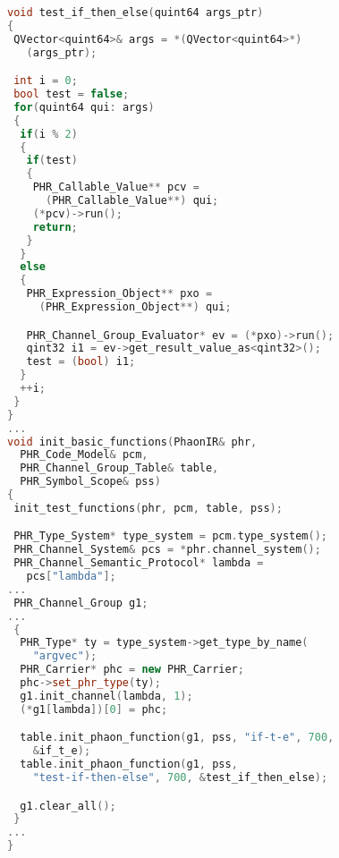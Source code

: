 \begin{lstlisting}[caption={%
\emblink{\#lst--ifte--\thelstlisting.pgvm-pdf}{Implementing If/Then/Else Blocks 
  (deferred evaluation)}},
  language = C++, numbers = none, escapechar = !,label={lst:ifte},
    basicstyle = \ttfamily\bfseries\footnotesize, linewidth = \linewidth]
void test_if_then_else(quint64 args_ptr)
{
 QVector<quint64>& args = *(QVector<quint64>*)
   (args_ptr);

 int i = 0;
 bool test = false;
 for(quint64 qui: args)
 {
  if(i % 2)
  {
   if(test)
   {
    PHR_Callable_Value** pcv = 
      (PHR_Callable_Value**) qui;
    (*pcv)->run();
    return;
   }
  }
  else
  {
   PHR_Expression_Object** pxo = 
     (PHR_Expression_Object**) qui;

   PHR_Channel_Group_Evaluator* ev = (*pxo)->run();
   qint32 i1 = ev->get_result_value_as<qint32>();
   test = (bool) i1;
  }
  ++i;
 }
}
...
void init_basic_functions(PhaonIR& phr, 
  PHR_Code_Model& pcm, 
  PHR_Channel_Group_Table& table, 
  PHR_Symbol_Scope& pss)
{
 init_test_functions(phr, pcm, table, pss);

 PHR_Type_System* type_system = pcm.type_system();
 PHR_Channel_System& pcs = *phr.channel_system();
 PHR_Channel_Semantic_Protocol* lambda = 
   pcs["lambda"];
...
 PHR_Channel_Group g1;
...
 {
  PHR_Type* ty = type_system->get_type_by_name(
    "argvec");
  PHR_Carrier* phc = new PHR_Carrier;
  phc->set_phr_type(ty);
  g1.init_channel(lambda, 1);
  (*g1[lambda])[0] = phc;

  table.init_phaon_function(g1, pss, "if-t-e", 700, 
    &if_t_e);
  table.init_phaon_function(g1, pss, 
    "test-if-then-else", 700, &test_if_then_else);

  g1.clear_all();
 }
...
}

\end{lstlisting}

\vspace{-2em}
